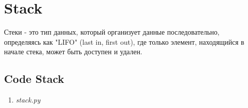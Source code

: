 
\section{Stack}

Стеки - это тип данных, который организует данные последовательно,
определяясь как "LIFO" (last in, first out), где только элемент,
находящийся в начале стека, может быть доступен и удален.

\subsection{Code Stack}

\begin{enumerate}

  \item \textit{stack.py}

  

\end{enumerate}
